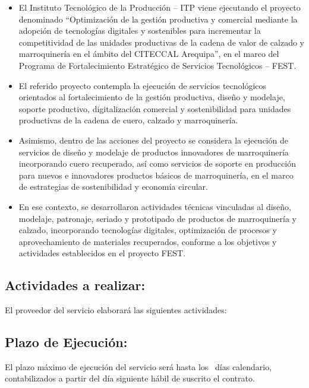 \documentclass[11pt, a4paper]{article}
\begin{document}
\begin{itemize}
    \item El Instituto Tecnológico de la Producción – ITP viene ejecutando el proyecto denominado “Optimización de la gestión productiva y comercial mediante la adopción de tecnologías digitales y sostenibles para incrementar la competitividad de las unidades productivas de la cadena de valor de calzado y marroquinería en el ámbito del CITECCAL Arequipa”, en el marco del Programa de Fortalecimiento Estratégico de Servicios Tecnológicos – FEST.
    \item El referido proyecto contempla la ejecución de servicios tecnológicos orientados al fortalecimiento de la gestión productiva, diseño y modelaje, soporte productivo, digitalización comercial y sostenibilidad para unidades productivas de la cadena de cuero, calzado y marroquinería.
    \item Asimismo, dentro de las acciones del proyecto se considera la ejecución de servicios de diseño y modelaje de productos innovadores de marroquinería incorporando cuero recuperado, así como servicios de soporte en producción para nuevos e innovadores productos básicos de marroquinería, en el marco de estrategias de sostenibilidad y economía circular.
    \item En ese contexto, se desarrollaron actividades técnicas vinculadas al diseño, modelaje, patronaje, seriado y prototipado de productos de marroquinería y calzado, incorporando tecnologías digitales, optimización de procesos y aprovechamiento de materiales recuperados, conforme a los objetivos y actividades establecidos en el proyecto FEST.
\end{itemize}


\subsection{Actividades a realizar:}
El proveedor del servicio elaborará las siguientes actividades:
\begin{enumerate}
\end{enumerate}

\subsection{Plazo de Ejecución:}

El plazo máximo de ejecución del servicio será hasta los \PlazoEjecucion\ días calendario, contabilizados a partir del día siguiente hábil de suscrito el contrato.
\end{document}
